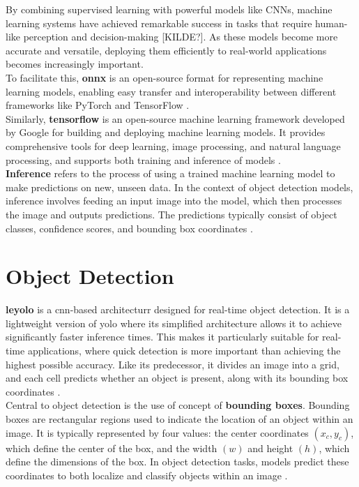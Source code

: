 By combining supervised learning with powerful models like CNNs, machine learning systems have achieved remarkable success in tasks that require human-like perception and decision-making [KILDE?]. As these models become more accurate and versatile, deploying them efficiently to real-world applications becomes increasingly important.  \\

To facilitate this, \textbf{\gls{onnx}} is an open-source format for representing machine learning models, enabling easy transfer and interoperability between different frameworks like PyTorch and TensorFlow \cite{roboflow:onnx}. \\

Similarly, \textbf{tensorflow} is an open-source machine learning framework developed by Google for building and deploying machine learning models. It provides comprehensive tools for deep learning, image processing, and natural language processing, and supports both training and inference of models \cite{nvidia:tensorflow}. \\

\textbf{Inference} refers to the process of using a trained machine learning model to make predictions on new, unseen data. In the context of object detection models, inference involves feeding an input image into the model, which then processes the image and outputs predictions. The predictions typically consist of object classes, confidence scores, and bounding box coordinates \cite{nvidia:inference}. \\

\section{Object Detection}

\textbf{\gls{leyolo}} is a \gls{cnn}-based architecturr designed for real-time object detection. It is a lightweight version of \gls{yolo} where its simplified architecture allows it to achieve significantly faster inference times. This makes it particularly suitable for real-time applications, where quick detection is more important than achieving the highest possible accuracy. Like its predecessor, it divides an image into a grid, and each cell predicts whether an object is present, along with its bounding box coordinates \cite{openreview:leyolo}.\\

Central to object detection is the use of concept of \textbf{bounding boxes}. Bounding boxes are rectangular regions used to indicate the location of an object within an image. It is typically represented by four values: the center coordinates \((x_c, y_c)\), which define the center of the box, and the width \((w)\) and height \((h)\), which define the dimensions of the box. In object detection tasks, models predict these coordinates to both localize and classify objects within an image \cite{peopleforai:boundingbox}. \\

